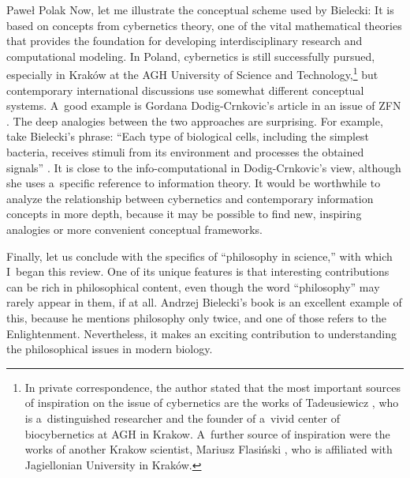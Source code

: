 \begin{newrevengenv}{Paweł Polak}
Now, let me illustrate the conceptual scheme used by Bielecki: It is based on concepts from cybernetics theory, one of the vital mathematical theories that provides the foundation for developing interdisciplinary research and computational modeling. In Poland, cybernetics is still successfully pursued, especially in Kraków at the AGH University of Science and Technology,\footnote{In private correspondence, the author stated that the most important sources of inspiration on the issue of cybernetics are the works of Tadeusiewicz
\parencites*[][]{tadeusiewicz_problemy_1994}[][]{tadeusiewicz_neurocybernetyka_2009}, %
 who is a~distinguished researcher and the founder of a~vivid center of biocybernetics at AGH in Krakow. A~further source of inspiration were the works of another Krakow scientist, Mariusz Flasiński 
\parencites*[][]{flasinski_every_1997}[][]{flasinski_introduction_2016}, %
 who is affiliated with Jagiellonian University in Kraków. } but contemporary international discussions use somewhat different conceptual systems. A~good example is Gordana Dodig-Crnkovic's article in an issue of ZFN 
\parencite[][]{dodig-crnkovic_search_2022}. %
 The deep analogies between the two approaches are surprising. For example, take Bielecki's phrase: ``Each type of biological cells, including the simplest bacteria, receives stimuli from its environment and processes the obtained signals'' 
\parencite[][p.5]{bielecki_models_2019}. %
 It is close to the info-computational in Dodig-Crnkovic's view, although she uses a~specific reference to information theory. It would be worthwhile to analyze the relationship between cybernetics and contemporary information concepts in more depth, because it may be possible to find new, inspiring analogies or more convenient conceptual frameworks.

Finally, let us conclude with the specifics of ``philosophy in science,'' with which I~began this review. One of its unique features is that interesting contributions can be rich in philosophical content, even though the word ``philosophy'' may rarely appear in them, if at all. Andrzej Bielecki's book is an excellent example of this, because he mentions philosophy only twice, and one of those refers to the Enlightenment. Nevertheless, it makes an exciting contribution to understanding the philosophical issues in modern biology.


\end{newrevengenv}
